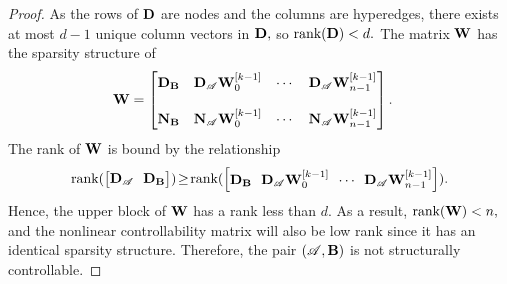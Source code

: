 \documentclass[journal,twoside,web]{ieeecolor}
\newcommand{\rank}{\text{rank}}
\begin{document}
\begin{proof}
    As the rows of $\textbf D$ are nodes and the columns are hyperedges, there exists at most $d-1$ unique column vectors in $\textbf D,$ so $\rank(\textbf D)<d.$
    The matrix $\textbf W$ has the sparsity structure of
    \begin{equation*}
    \begin{split}
        \textbf W&=\begin{bmatrix}
            \textbf D_\textbf B 
        & \textbf D_\mathscr A\textbf W_0^{[k-1]}&\cdots&\textbf D_\mathscr A\textbf W_{n-1}^{[k-1]}\\
            &&\\
            \textbf N_\textbf B & \textbf N_\mathscr A \textbf W_0^{[k-1]}&\cdots&\textbf N_\mathscr A\textbf W_{n-1}^{[k-1]}\\
        \end{bmatrix}.
    \end{split}
    \end{equation*}
    The rank of $\textbf W$ is bound by the relationship
    \begin{equation*}
    \rank(\begin{bmatrix}
            \textbf D_\mathscr A\!&\!\textbf D_\textbf B
    \end{bmatrix})\!\geq\!    \rank(\begin{bmatrix}\textbf D_\textbf B \!&\! \textbf D_\mathscr A\textbf W_0^{[k-1]} \!&\!\cdots\!&\!\textbf D_\mathscr A\textbf W_{n-1}^{[k-1]}\end{bmatrix}).
    \end{equation*}
    Hence, the upper block of $\textbf W$ has a rank less than $d.$ As a result, $\rank(\textbf W)<n,$ and the nonlinear controllability matrix will also be low rank since it has an identical sparsity structure. Therefore, the pair $(\mathscr A,\textbf B)$ is not structurally controllable. 
    

\end{proof}
\end{document}
